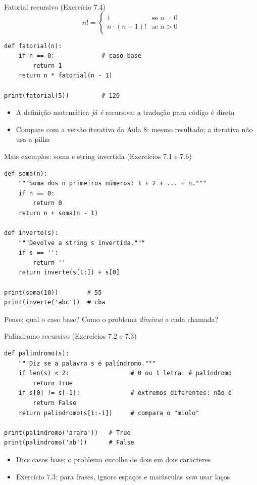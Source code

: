 \documentclass[aspectratio=169,10pt,t]{beamer}
\begin{document}
\begin{frame}[fragile]{Fatorial recursivo (Exercício 7.4)}
  \[ n! = \begin{cases} 1 & \text{se } n = 0\\ n\cdot(n-1)! & \text{se } n > 0 \end{cases} \]
\begin{lstlisting}
def fatorial(n):
    if n == 0:             # caso base
        return 1
    return n * fatorial(n - 1)

print(fatorial(5))         # 120
\end{lstlisting}
  \begin{itemize}
    \item A definição matemática \emph{já é} recursiva: a tradução para código é direta
    \item Compare com a versão iterativa da Aula 8: mesmo resultado; a iterativa não usa a pilha
  \end{itemize}
\end{frame}

\begin{frame}[fragile]{Mais exemplos: soma e string invertida (Exercícios 7.1 e 7.6)}
\begin{lstlisting}
def soma(n):
    """Soma dos n primeiros números: 1 + 2 + ... + n."""
    if n == 0:
        return 0
    return n + soma(n - 1)

def inverte(s):
    """Devolve a string s invertida."""
    if s == '':
        return ''
    return inverte(s[1:]) + s[0]

print(soma(10))        # 55
print(inverte('abc'))  # cba
\end{lstlisting}
  \small Pense: qual o caso base? Como o problema \emph{diminui} a cada chamada?
\end{frame}

\begin{frame}[fragile]{Palíndromo recursivo (Exercícios 7.2 e 7.3)}
\begin{lstlisting}
def palindromo(s):
    """Diz se a palavra s é palíndromo."""
    if len(s) < 2:                 # 0 ou 1 letra: é palíndromo
        return True
    if s[0] != s[-1]:              # extremos diferentes: não é
        return False
    return palindromo(s[1:-1])     # compara o "miolo"

print(palindromo('arara'))   # True
print(palindromo('ab'))      # False
\end{lstlisting}
  \begin{itemize}
    \item Dois casos base; o problema encolhe \alert{de dois em dois} caracteres
    \item Exercício 7.3: para frases, ignore espaços e maiúsculas \emph{sem} usar laços
  \end{itemize}
\end{frame}
\end{document}
